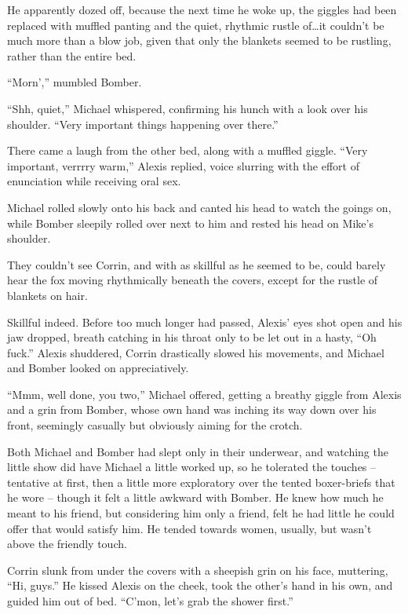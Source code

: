 \documentclass[12pt,letterpaper,oneside]{memoir}
\begin{document}
  He apparently dozed off, because the next time he woke up, the giggles had been replaced with muffled panting and the quiet, rhythmic rustle of\ldots{}it couldn't be much more than a blow job, given that only the blankets seemed to be rustling, rather than the entire bed.

  ``Morn','' mumbled Bomber.

  ``Shh, quiet,'' Michael whispered, confirming his hunch with a look over his shoulder.  ``Very important things happening over there.''

  There came a laugh from the other bed, along with a muffled giggle. ``Very important, verrrry warm,'' Alexis replied, voice slurring with the effort of enunciation while receiving oral sex.

  Michael rolled slowly onto his back and canted his head to watch the goings on, while Bomber sleepily rolled over next to him and rested his head on Mike's shoulder.

  They couldn't see Corrin, and with as skillful as he seemed to be, could barely hear the fox moving rhythmically beneath the covers, except for the rustle of blankets on hair.

  Skillful indeed.  Before too much longer had passed, Alexis' eyes shot open and his jaw dropped, breath catching in his throat only to be let out in a hasty, ``Oh fuck.''  Alexis shuddered, Corrin drastically slowed his movements, and Michael and Bomber looked on appreciatively.

  ``Mmm, well done, you two,'' Michael offered, getting a breathy giggle from Alexis and a grin from Bomber, whose own hand was inching its way down over his front, seemingly casually but obviously aiming for the crotch.

  Both Michael and Bomber had slept only in their underwear, and watching the little show did have Michael a little worked up, so he tolerated the touches -- tentative at first, then a little more exploratory over the tented boxer-briefs that he wore -- though it felt a little awkward with Bomber.  He knew how much he meant to his friend, but considering him only a friend, felt he had little he could offer that would satisfy him. He tended towards women, usually, but wasn't above the friendly touch.

  Corrin slunk from under the covers with a sheepish grin on his face, muttering, ``Hi, guys.''  He kissed Alexis on the cheek, took the other's hand in his own, and guided him out of bed.  ``C'mon, let's grab the shower first.''
\end{document}
